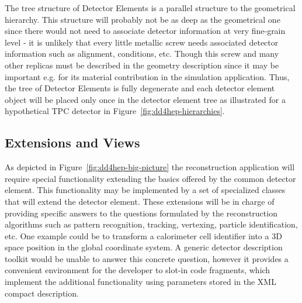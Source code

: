 \documentclass[a4paper]{jpconf}
\begin{document}
\noindent
The tree structure of
Detector Elements is a parallel structure to the geometrical hierarchy.
This structure will probably not be as deep as the geometrical one since 
there would not need to associate detector information at very fine-grain 
level - it is unlikely that every little metallic screw
needs associated detector information such as alignment, conditions, etc.
Though this screw and many other replicas must be described in the geometry 
description since it may be important e.g. for its material contribution 
in the simulation application. Thus, the tree of Detector Elements is
fully degenerate and each detector element object will be placed only 
once in the detector element tree as illustrated for a hypothetical
TPC detector in Figure~\ref{fig:dd4hep-hierarchies}.

\subsection{Extensions and Views}
\label{subsect:extesions-and-views}

\noindent
As depicted in Figure~\ref{fig:dd4hep-big-picture} the reconstruction 
application will require special functionality extending the basics 
offered by the common detector element. This functionality may be
implemented by a set of specialized classes that will extend the 
detector element. These extensions will be in charge 
of providing specific answers to the questions formulated by the 
reconstruction algorithms such as pattern recognition, tracking, vertexing, 
particle identification, etc. One example could be to transform a calorimeter 
cell identifier into a 3D space position in the global coordinate system.
A generic detector description toolkit would be unable 
to answer this concrete question, however it provides a convenient 
environment for the developer to slot-in code fragments, which implement the
additional functionality using parameters stored
in the XML compact description.
\end{document}
